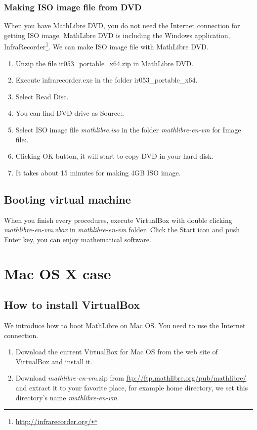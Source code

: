 \documentclass[a4]{article}
\newcommand{\ir}{ir053\_portable\_x64}
\newcommand{\vm}{{\em mathlibre-en-vm}}
\begin{document}
\subsubsection{Making ISO image file from DVD}
When you have MathLibre DVD, 
you do not need the Internet connection for getting ISO image.
MathLibre DVD is including the Windows application, InfraRecorder\footnote{\url{http://infrarecorder.org/}}.
We can make ISO image file with MathLibre DVD.
\begin{enumerate}
 \item Unzip the file \ir.zip{} in MathLibre DVD.
 \item Execute infrarecorder.exe in the folder \ir.
 \item Select Read Disc.
 \item You can find DVD drive as Source:.
 \item Select ISO image file {\em mathlibre.iso} in the folder \vm{} for Image file:.
 \item Clicking OK button, it will start to copy DVD in your hard disk.
 \item It takes about 15 minutes for making 4GB ISO image.
\end{enumerate}

\subsection{Booting virtual machine}
When you finish every procedures,
execute VirtualBox with double clicking \vm.{\em vbox} in \vm{} folder.
Click the Start icon and push Enter key, you can enjoy mathematical software.

\section{Mac OS X case}
\subsection{How to install VirtualBox}
We introduce how to boot MathLibre on Mac OS.
You need to use the Internet connection.
\begin{enumerate}
 \item Download the current VirtualBox for Mac OS from the web site of VirtualBox and install it.
 \item Download \vm.zip{} from
       \url{ftp://ftp.mathlibre.org/pub/mathlibre/} and extract it to
       your favorite place, for example home directory, we set this
       directory's name \vm.
\end{enumerate}
\end{document}
